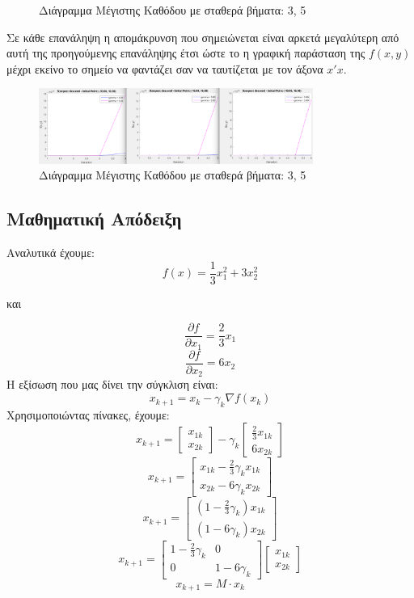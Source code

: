 \documentclass{report}
\begin{document}
\begin{itemize}
\begin{figure}[H]
        \caption{Διάγραμμα Μέγιστης Καθόδου με σταθερά βήματα: 3, 5}
    \end{figure}
    Σε κάθε επανάληψη η απομάκρυνση που σημειώνεται είναι αρκετά μεγαλύτερη από αυτή της
    προηγούμενης επανάληψης έτσι ώστε το η γραφική παράσταση της $f(x,y)$ μέχρι εκείνο το 
    σημείο να φαντάζει σαν να ταυτίζεται με τον άξονα $x'x$. 
    \begin{figure}[H]
        \centering
        \includegraphics[width=0.8\textwidth]{media/thema1-2-2.png}
        \caption{Διάγραμμα Μέγιστης Καθόδου με σταθερά βήματα: 3, 5}
    \end{figure}
\end{itemize}

\subsection{Μαθηματική Απόδειξη}
Αναλυτικά έχουμε:
$$f(x) = \frac{1}{3} x_1^2 + 3x_2^2$$
\begin{center}
    και
\end{center}
$$\frac{\partial f}{\partial x_1} = \frac{2}{3}x_1$$
$$\frac{\partial f}{\partial x_2} = 6x_2$$
Η εξίσωση που μας δίνει την σύγκλιση είναι:
$$x_{k+1} = x_k - \gamma_k \nabla f(x_k)$$
Χρησιμοποιώντας πίνακες, έχουμε:
$$x_{k+1} = \begin{bmatrix} x_{1k} \\ x_{2k} \end{bmatrix} - \gamma_k \begin{bmatrix} \frac{2}{3}x_{1k} \\ 6x_{2k} \end{bmatrix}$$
$$x_{k+1} = \begin{bmatrix} x_{1k} - \frac{2}{3}\gamma_k x_{1k} \\ x_{2k} - 6\gamma_k x_{2k} \end{bmatrix}$$
$$x_{k+1} = \begin{bmatrix} (1 - \frac{2}{3}\gamma_k)x_{1k} \\ (1 - 6\gamma_k)x_{2k} \end{bmatrix}$$
$$x_{k+1} = \begin{bmatrix} 1 - \frac{2}{3}\gamma_k & 0 \\ 0 & 1 - 6\gamma_k \end{bmatrix} \begin{bmatrix} x_{1k} \\ x_{2k} \end{bmatrix}$$
$$x_{k+1} = M \cdot x_k$$
\end{document}
